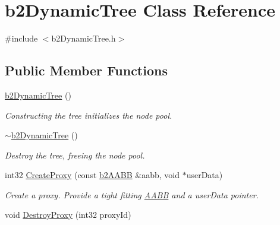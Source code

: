 \hypertarget{classb2DynamicTree}{}\section{b2\+Dynamic\+Tree Class Reference}
\label{classb2DynamicTree}


{\ttfamily \#include $<$b2\+Dynamic\+Tree.\+h$>$}

\subsection*{Public Member Functions}
\begin{DoxyCompactItemize}
\item 
\mbox{\label{classb2DynamicTree_a8af64cf6a1566fa4c5b5c9683bd937d9}} 
\hyperlink{classb2DynamicTree_a8af64cf6a1566fa4c5b5c9683bd937d9}{b2\+Dynamic\+Tree} ()
\begin{DoxyCompactList}\small\item\em Constructing the tree initializes the node pool. \end{DoxyCompactList}\item 
\mbox{\label{classb2DynamicTree_a9060565fc63b4dd87d9560775c076786}} 
\hyperlink{classb2DynamicTree_a9060565fc63b4dd87d9560775c076786}{$\sim$b2\+Dynamic\+Tree} ()
\begin{DoxyCompactList}\small\item\em Destroy the tree, freeing the node pool. \end{DoxyCompactList}\item 
\mbox{\label{classb2DynamicTree_ae44676f12977dada46037da47fc7ffbf}} 
int32 \hyperlink{classb2DynamicTree_ae44676f12977dada46037da47fc7ffbf}{Create\+Proxy} (const \hyperlink{structb2AABB}{b2\+A\+A\+BB} \&aabb, void $\ast$user\+Data)
\begin{DoxyCompactList}\small\item\em Create a proxy. Provide a tight fitting \hyperlink{classAABB}{A\+A\+BB} and a user\+Data pointer. \end{DoxyCompactList}\item 
\mbox{\label{classb2DynamicTree_a62aa451e7d7fe029818dd05f76ea9cdc}} 
void \hyperlink{classb2DynamicTree_a62aa451e7d7fe029818dd05f76ea9cdc}{Destroy\+Proxy} (int32 proxy\+Id)

\end{DoxyCompactItemize}
